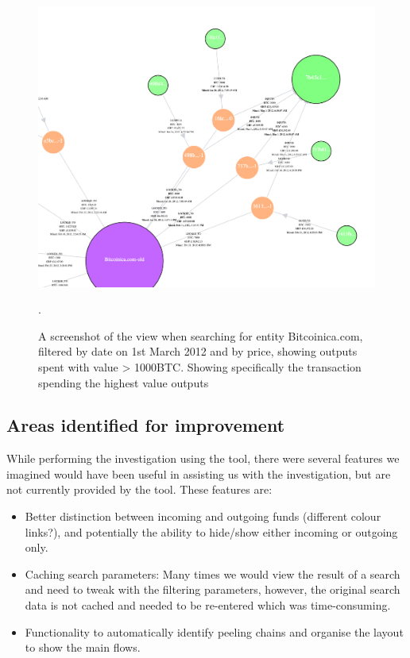 \begin{figure}[h!]
  \centering
  \includegraphics[width = 15cm]{./figures/theft-high-value-tx}\\[0.5cm]
  \caption{A screenshot of the view when searching for entity Bitcoinica.com, filtered by date on 1st March 2012 and by price, showing outputs spent with value > 1000BTC. Showing specifically the transaction spending the highest value outputs}.
  \label{fig:theft-highest-value-outputs}
\end{figure}

\subsection{Areas identified for improvement}
While performing the investigation using the tool, there were several features we imagined would have been useful in assisting us with the investigation, but are not currently provided by the tool. These features are:
\begin{itemize}
    \item Better distinction between incoming and outgoing funds (different colour links?), and potentially the ability to hide/show either incoming or outgoing only.
    \item Caching search parameters: Many times we would view the result of a search and need to tweak with the filtering parameters, however, the original search data is not cached and needed to be re-entered which was time-consuming.
    \item Functionality to automatically identify peeling chains and organise the layout to show the main flows. 
\end{itemize}

